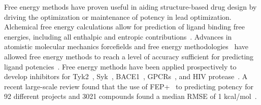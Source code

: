 \documentclass[9pt,lineno]{elife-modified} %
\begin{document}
%
%
%
%
Free energy methods have proven useful in aiding structure-based drug design by driving the optimization or maintenance of potency in lead optimization. Alchemical free energy calculations allow for prediction of ligand binding free energies, including all enthalpic and entropic contributions~\citep{Chodera2011-jn}. Advances in atomistic molecular mechanics forcefields and free energy methodologies~\citep{Huang:J.Comput.Chem.:2013,Maier:J.Chem.TheoryComput.:2015,Harder:J.Chem.TheoryComput.:2016,Cournia:2017ip} have allowed free energy methods to reach a level of accuracy  sufficient for predicting ligand potencies~\citep{BROWN2009420}. Free energy methods have been applied prospectively to develop inhibitors for Tyk2~\citep{Abel2017-gw}, Syk~\citep{Lovering:2016fg}, BACE1~\citep{Ciordia:2016dn}, GPCRs~\citep{Lenselink:2016ip}, and HIV protease~\citep{Jorgensen:2016dv}. A recent large-scale review found that the use of FEP+~\citep{Wang:J.Am.Chem.Soc.:2015} to predicting potency for 92 different projects and 3021 compounds found a median RMSE of 1 kcal/mol~\citep{Abel:2017jt}. 
\end{document}
